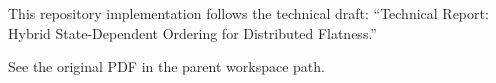 \documentclass{article}
\begin{document}
This repository implementation follows the technical draft:
``Technical Report: Hybrid State-Dependent Ordering for Distributed Flatness.''

See the original PDF in the parent workspace path.
\end{document}

